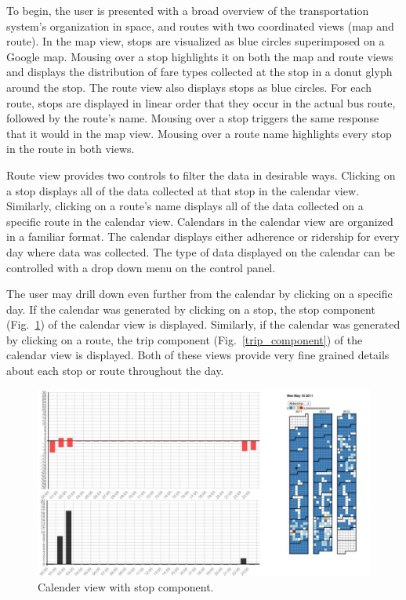 \documentclass[journal]{vgtc}                %
\begin{document}
To begin, the user is presented with a broad overview of the transportation system's organization in space, and routes with two coordinated views (map and route). In the map view, stops are visualized as blue circles superimposed on a Google map. Mousing over a stop highlights it on both the map and route views and displays the distribution of fare types collected at the stop in a donut glyph around the stop. The route view also displays stops as blue circles. For each route, stops are displayed in linear order that they occur in the actual bus route, followed by the route's name. Mousing over a stop triggers the same response that it would in the map view. Mousing over a route name highlights every stop in the route in both views.

Route view provides two controls to filter the data in desirable ways. Clicking on a stop displays all of the data collected at that stop in the calendar view. Similarly, clicking on a route's name displays all of the data collected on a specific route in the calendar view. Calendars in the calendar view are organized in a familiar format. The calendar displays either adherence or ridership for every day where data was collected. The type of data displayed on the calendar can be controlled with a drop down menu on the control panel.

The user may drill down even further from the calendar by clicking on a specific day. If the calendar was generated by clicking on a stop, the stop component (Fig.~\ref{calendar_view_big}) of the calendar view is displayed. Similarly, if the calendar was generated by clicking on a route, the trip component (Fig.~\ref{trip_component}) of the calendar view is displayed. Both of these views provide very fine grained details about each stop or route throughout the day.

\begin{figure}[htb]
 \centering
 \includegraphics[width=16cm]{img/image08}
 \caption{Calender view with stop component.}
 \label{calendar_view_big}
\end{figure}
\end{document}
